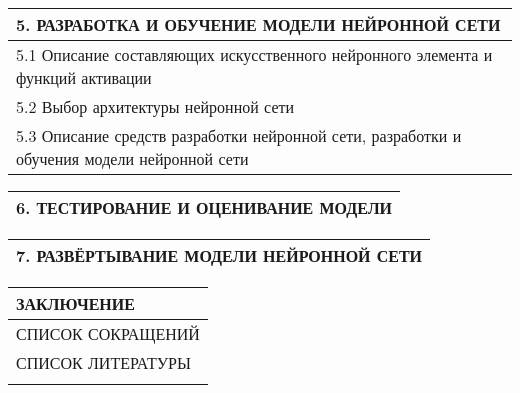 \documentclass[12pt, А4, twoside]{article} %
\begin{document}
\begin{flushleft}
		\begin{tabular}{p{17.25cm}} 
			\textsf{5. РАЗРАБОТКА И ОБУЧЕНИЕ МОДЕЛИ НЕЙРОННОЙ СЕТИ} \vspace{1pt}\\ \hline 
			\hspace{0.3cm}\textsf{5.1 Описание составляющих искусственного нейронного элемента и функций активации} \vspace{1pt} \\ \hline 
			\hspace{0.3cm}\textsf{5.2 Выбор архитектуры нейронной сети} \vspace{1pt} \\ \hline 
			\hspace{0.3cm}\textsf{5.3 Описание средств разработки нейронной сети, разработки и обучения модели нейронной сети} \vspace{1pt} \\ \hline 
		\end{tabular}  
		
		\begin{tabular}{p{17.25cm}} 
			\textsf{6. ТЕСТИРОВАНИЕ И ОЦЕНИВАНИЕ МОДЕЛИ} \vspace{1pt} \\ \hline 
		\end{tabular} 
		
		\begin{tabular}{p{17.25cm}} 
			\textsf{7. РАЗВЁРТЫВАНИЕ МОДЕЛИ НЕЙРОННОЙ СЕТИ} \vspace{1pt}\\ \hline 
		\end{tabular}  
		
		\begin{tabular}{p{17.25cm}} 
			\textsf{ЗАКЛЮЧЕНИЕ} \vspace{2pt}\\ \hline 
			\textsf{СПИСОК СОКРАЩЕНИЙ} \vspace{1pt}\\ \hline 
			\textsf{СПИСОК ЛИТЕРАТУРЫ} \vspace{2pt}\\ \hline 
			\\ \hline
		\end{tabular} 
		

\end{flushleft}
\end{document}
